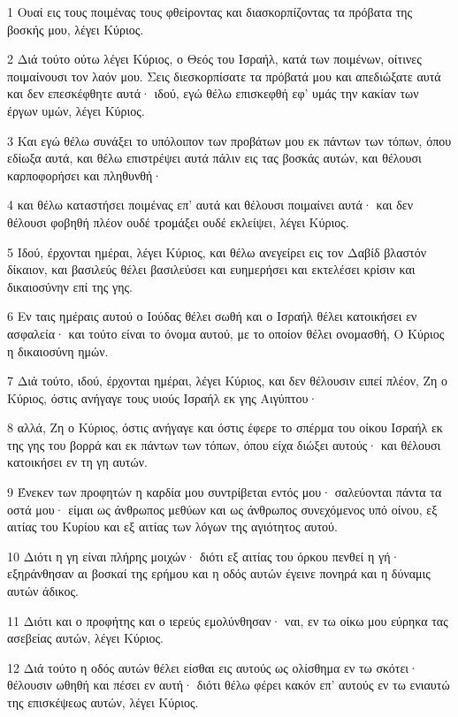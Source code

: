 \par 1 Ουαί εις τους ποιμένας τους φθείροντας και διασκορπίζοντας τα πρόβατα της βοσκής μου, λέγει Κύριος.
\par 2 Διά τούτο ούτω λέγει Κύριος, ο Θεός του Ισραήλ, κατά των ποιμένων, οίτινες ποιμαίνουσι τον λαόν μου. Σεις διεσκορπίσατε τα πρόβατά μου και απεδιώξατε αυτά και δεν επεσκέφθητε αυτά· ιδού, εγώ θέλω επισκεφθή εφ' υμάς την κακίαν των έργων υμών, λέγει Κύριος.
\par 3 Και εγώ θέλω συνάξει το υπόλοιπον των προβάτων μου εκ πάντων των τόπων, όπου εδίωξα αυτά, και θέλω επιστρέψει αυτά πάλιν εις τας βοσκάς αυτών, και θέλουσι καρποφορήσει και πληθυνθή·
\par 4 και θέλω καταστήσει ποιμένας επ' αυτά και θέλουσι ποιμαίνει αυτά· και δεν θέλουσι φοβηθή πλέον ουδέ τρομάξει ουδέ εκλείψει, λέγει Κύριος.
\par 5 Ιδού, έρχονται ημέραι, λέγει Κύριος, και θέλω ανεγείρει εις τον Δαβίδ βλαστόν δίκαιον, και βασιλεύς θέλει βασιλεύσει και ευημερήσει και εκτελέσει κρίσιν και δικαιοσύνην επί της γης.
\par 6 Εν ταις ημέραις αυτού ο Ιούδας θέλει σωθή και ο Ισραήλ θέλει κατοικήσει εν ασφαλεία· και τούτο είναι το όνομα αυτού, με το οποίον θέλει ονομασθή, Ο Κύριος η δικαιοσύνη ημών.
\par 7 Διά τούτο, ιδού, έρχονται ημέραι, λέγει Κύριος, και δεν θέλουσιν ειπεί πλέον, Ζη ο Κύριος, όστις ανήγαγε τους υιούς Ισραήλ εκ γης Αιγύπτου·
\par 8 αλλά, Ζη ο Κύριος, όστις ανήγαγε και όστις έφερε το σπέρμα του οίκου Ισραήλ εκ της γης του βορρά και εκ πάντων των τόπων, όπου είχα διώξει αυτούς· και θέλουσι κατοικήσει εν τη γη αυτών.
\par 9 Ένεκεν των προφητών η καρδία μου συντρίβεται εντός μου· σαλεύονται πάντα τα οστά μου· είμαι ως άνθρωπος μεθύων και ως άνθρωπος συνεχόμενος υπό οίνου, εξ αιτίας του Κυρίου και εξ αιτίας των λόγων της αγιότητος αυτού.
\par 10 Διότι η γη είναι πλήρης μοιχών· διότι εξ αιτίας του όρκου πενθεί η γή· εξηράνθησαν αι βοσκαί της ερήμου και η οδός αυτών έγεινε πονηρά και η δύναμις αυτών άδικος.
\par 11 Διότι και ο προφήτης και ο ιερεύς εμολύνθησαν· ναι, εν τω οίκω μου εύρηκα τας ασεβείας αυτών, λέγει Κύριος.
\par 12 Διά τούτο η οδός αυτών θέλει είσθαι εις αυτούς ως ολίσθημα εν τω σκότει· θέλουσιν ωθηθή και πέσει εν αυτή· διότι θέλω φέρει κακόν επ' αυτούς εν τω ενιαυτώ της επισκέψεως αυτών, λέγει Κύριος.
